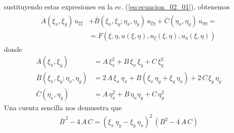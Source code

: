 sustituyendo estas expresiones en la ec. (\ref{eq:ecuacion_02_01}), obtenemos
\begin{align}
\begin{aligned}
\overline{A} (\xi_{x}, \xi_{y}) \, u_{\xi \xi} &+ \overline{B} (\xi_{x}, \xi_{y}; \eta_{x},\eta_{y}) \, u_{\xi \eta} + \overline{C} (\eta_{x}, \eta_{y}) \, u_{\eta \eta} = \\
&= F (\xi, \eta, u(\xi, \eta), u_{\xi}( \xi, \eta), u_{\eta} (\xi, \eta))
\end{aligned}
\label{eq:ecuacion_02_04}    
\end{align}
donde
\begin{align*}
\overline{A} (\xi_{x}, \xi_{y}) &= A \, \xi_{x}^{2} + B \, \xi_{x} \, \xi_{y} + C \, \xi_{y}^{2} \\
\overline{B} (\xi_{x}, \xi_{y}; \eta_{x},\eta_{y}) &= 2 \, A \, \xi_{x} \, \eta_{x} + B (\xi_{x} \, \eta_{y} + \xi_{y} \, \eta_{x}) + 2 \, C \, \xi_{y} \, \eta_{y} \\
\overline{C} (\eta_{x}, \eta_{y}) &= A \, \eta_{x}^{2} + B \, \eta_{x} \eta_{y} + C \, \eta_{y}^{2}
\end{align*}
Una cuenta sencilla nos demuestra que
\begin{align}
\overline{B}^{\, 2} - 4 \, A \, C = (\xi_{x} \, \eta_{y} - \xi_{y} \, \eta_{x})^{2} \, (B^{2} - 4 \, A \, C)
\label{eq:ecuacion_02_05}    
\end{align}
